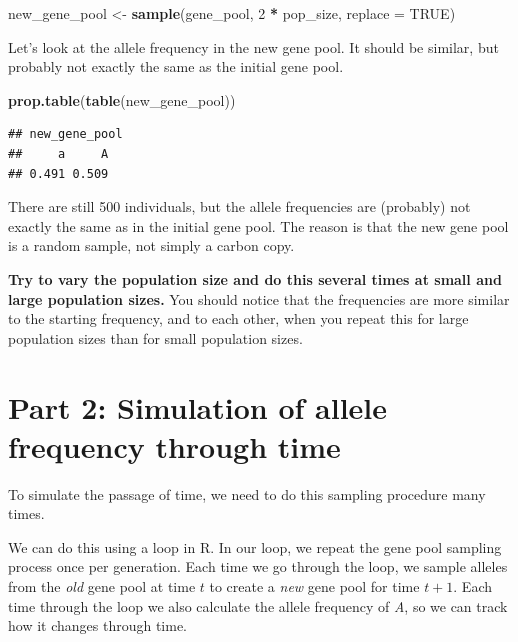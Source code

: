 \documentclass[
  a4paper]{book}
\newenvironment{Shaded}{\begin{snugshade}}{\end{snugshade}}
\newcommand{\AttributeTok}[1]{\textcolor[rgb]{0.13,0.29,0.53}{#1}}
\newcommand{\ConstantTok}[1]{\textcolor[rgb]{0.56,0.35,0.01}{#1}}
\newcommand{\DecValTok}[1]{\textcolor[rgb]{0.00,0.00,0.81}{#1}}
\newcommand{\FunctionTok}[1]{\textcolor[rgb]{0.13,0.29,0.53}{\textbf{#1}}}
\newcommand{\NormalTok}[1]{#1}
\newcommand{\OtherTok}[1]{\textcolor[rgb]{0.56,0.35,0.01}{#1}}
\newcommand{\SpecialCharTok}[1]{\textcolor[rgb]{0.81,0.36,0.00}{\textbf{#1}}}
\begin{document}
\begin{Shaded}
\begin{Highlighting}[]
\NormalTok{new\_gene\_pool }\OtherTok{\textless{}{-}} \FunctionTok{sample}\NormalTok{(gene\_pool, }\DecValTok{2} \SpecialCharTok{*}\NormalTok{ pop\_size, }\AttributeTok{replace =} \ConstantTok{TRUE}\NormalTok{)}
\end{Highlighting}
\end{Shaded}

Let's look at the allele frequency in the new gene pool. It should be similar, but probably not exactly the same as the initial gene pool.

\begin{Shaded}
\begin{Highlighting}[]
\FunctionTok{prop.table}\NormalTok{(}\FunctionTok{table}\NormalTok{(new\_gene\_pool))}
\end{Highlighting}
\end{Shaded}

\begin{verbatim}
## new_gene_pool
##     a     A 
## 0.491 0.509
\end{verbatim}

There are still 500 individuals, but the allele frequencies are (probably) not exactly the same as in the initial gene pool. The reason is that the new gene pool is a random sample, not simply a carbon copy.

\textbf{Try to vary the population size and do this several times at small and large population sizes.} You should notice that the frequencies are more similar to the starting frequency, and to each other, when you repeat this for large population sizes than for small population sizes.

\section{Part 2: Simulation of allele frequency through time}\label{part-2-simulation-of-allele-frequency-through-time}

To simulate the passage of time, we need to do this sampling procedure many times.

We can do this using a loop in R. In our loop, we repeat the gene pool sampling process once per generation. Each time we go through the loop, we sample alleles from the \emph{old} gene pool at time \(t\) to create a \emph{new} gene pool for time \(t+1\). Each time through the loop we also calculate the allele frequency of \emph{A}, so we can track how it changes through time.
\end{document}
